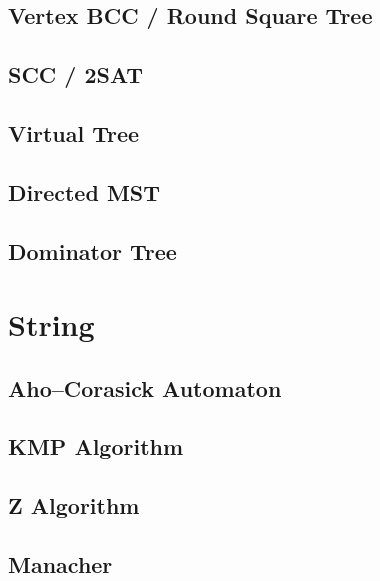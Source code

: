 \subsection{Vertex BCC / Round Square Tree}
\subsection{SCC / 2SAT}
% 
\subsection{Virtual Tree}

\subsection{Directed MST} %
\subsection{Dominator Tree}

\section{String}
\subsection{Aho–Corasick Automaton}

\subsection{KMP Algorithm}

\subsection{Z Algorithm}
\subsection{Manacher}
